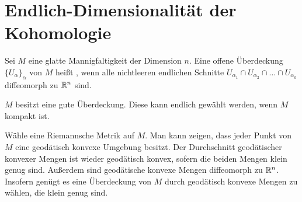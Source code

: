 \section{Endlich-Dimensionalität der Kohomologie}
Sei $M$ eine glatte Mannigfaltigkeit der Dimension $n$.
\Def{}
Eine offene Überdeckung $\{U_\alpha\}_\alpha$ von $M$ heißt , wenn alle nichtleeren endlichen Schnitte $U_{\alpha_1}\cap U_{\alpha_2} \cap \ldots \cap U_{\alpha_k}$ diffeomorph zu $\mathbb{R}^n$ sind.

\Lem{}
$M$ besitzt eine gute Überdeckung. Diese kann endlich gewählt werden, wenn $M$ kompakt ist.
\begin{Beweisskizze}{}
Wähle eine Riemannsche Metrik auf $M$. Man kann zeigen, dass jeder Punkt von $M$ eine geodätisch konvexe Umgebung besitzt. Der Durchschnitt geodätischer konvexer Mengen ist wieder geodätisch konvex, sofern die beiden Mengen klein genug sind. Außerdem sind geodätische konvexe Mengen diffeomorph zu $\mathbb{R}^n$.\\
Insofern genügt es eine Überdeckung von $M$ durch geodätisch konvexe Mengen zu wählen, die klein genug sind.
\end{Beweisskizze}

